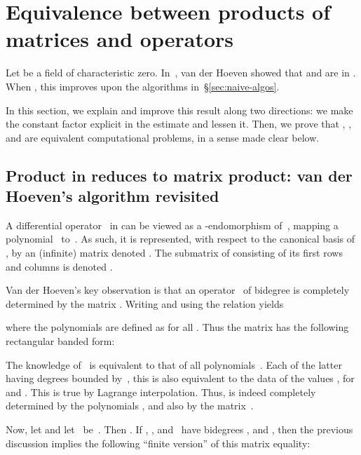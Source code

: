 \documentclass{sig-alt-full}
\begin{document}
\section{Equivalence between products of matrices and operators}
\label{sec:equiv}
Let  be a field of characteristic zero.
In~\cite{vdHoeven02}, van der Hoeven showed that  and  are in .
When , this improves upon the algorithms in~\S\ref{sec:naive-algos}.

In this section, we explain and improve this result along two directions: we make the constant factor explicit  in the estimate   and lessen it.
Then, we prove that , , and  are equivalent computational problems, in a sense made clear below.

\subsection{Product in   reduces to matrix product: van der Hoeven's algorithm revisited}\label{ssec:OperToMat}

A differential operator~ in  can be viewed as a -endomorphism of~, mapping a polynomial~ to~.
As such, it is represented, with respect to the canonical basis  of , by an (infinite) matrix  denoted .
The submatrix of  consisting of its first  rows and  columns is denoted .

Van der Hoeven's key observation is that an operator~ of bidegree  is completely determined by the matrix  .
Writing  and using the relation  yields

where the polynomials  are defined as  for all .
Thus the matrix  has the following rectangular banded form:




The knowledge of~ is equivalent to that of all  polynomials~.
Each of the latter having degrees bounded by~, this is also equivalent to the data of the values , for  and .
This is true by Lagrange interpolation.
Thus,  is indeed completely determined by the  polynomials , 
and also by the matrix~.

Now, let   and let~ be~.
Then .
If , , and~ have bidegrees , and ,  then the previous discussion implies the following ``finite version'' of this matrix equality:
\end{document}
